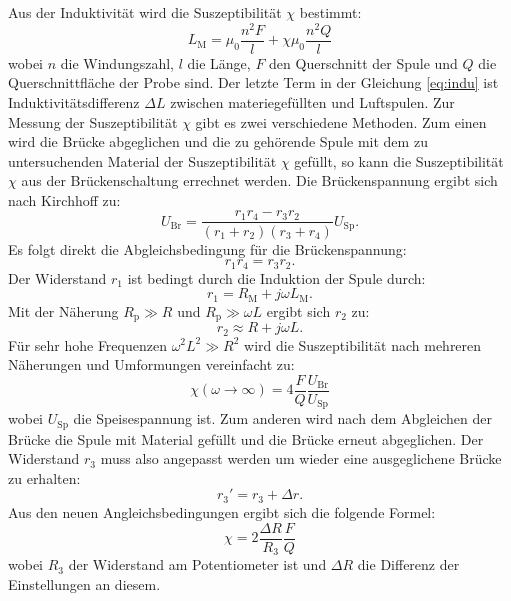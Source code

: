 Aus der Induktivität wird die Suszeptibilität $\chi$ bestimmt:
\begin{equation}
\label{eq:indu}
L_\text{M} = \mu_0 \frac{n^2F}{l} + \chi \mu_0 \frac{n^2Q}{l}
\end{equation}
wobei $n$ die Windungszahl, $l$ die Länge, $F$ den Querschnitt der Spule und $Q$ die Querschnittfläche der Probe sind. Der letzte Term in der Gleichung \ref{eq:indu} ist Induktivitätsdifferenz $\Delta L$ zwischen materiegefüllten und Luftspulen. Zur Messung der Suszeptibilität $\chi$ gibt es zwei verschiedene Methoden. Zum einen wird die Brücke abgeglichen und die zu gehörende Spule mit dem zu untersuchenden Material der Suszeptibilität $\chi$ gefüllt, so kann die Suszeptibilität $\chi$ aus der Brückenschaltung errechnet werden. Die Brückenspannung ergibt sich nach Kirchhoff zu:
\begin{equation*}
U_\text{Br} = \frac{r_1r_4-r_3r_2}{(r_1+r_2)(r_3+r_4)}U_\text{Sp}.
\end{equation*}
Es folgt direkt die Abgleichsbedingung für die Brückenspannung:
\begin{equation*}
r_1r_4 = r_3r_2.
\end{equation*}
Der Widerstand $r_1$ ist bedingt durch die Induktion der Spule durch:
\begin{equation*}
r_1 = R_\text{M} + j \omega L_\text{M}.
\end{equation*}
Mit der Näherung $R_\text{p} \gg R $ und $R_\text{p} \gg \omega L$ ergibt sich $r_2$ zu:
\begin{equation*}
r_2 \approx R + j \omega L.
\end{equation*}
Für sehr hohe Frequenzen $\omega^2 L^2 \gg R^2$ wird die Suszeptibilität nach mehreren Näherungen und Umformungen vereinfacht zu:
\begin{equation}
\chi(\omega \rightarrow \infty) = 4 \frac{F}{Q}\frac{U_\text{Br}}{U_\text{Sp}}
\end{equation}
wobei $U_\text{Sp}$ die Speisespannung ist.
Zum anderen wird nach dem Abgleichen der Brücke die Spule mit Material gefüllt und die Brücke erneut abgeglichen.
Der Widerstand $r_3$ muss also angepasst werden um wieder eine ausgeglichene Brücke zu erhalten:
\begin{equation*}
r_3' = r_3 + \Delta r.
\end{equation*}
Aus den neuen Angleichsbedingungen ergibt sich die folgende Formel:
\begin{equation}
\chi = 2 \frac{\Delta R}{R_3}\frac{F}{Q}
\label{eqn:chiwiderstand}
\end{equation}
wobei $R_3$ der Widerstand am Potentiometer ist und $\Delta R$ die Differenz der Einstellungen an diesem.
